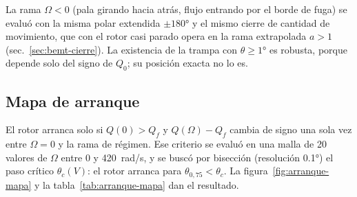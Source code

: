 \begin{nota}
La rama $\Omega<0$ (pala girando hacia atrás, flujo entrando por el borde de fuga) se evaluó
con la misma polar extendida $\pm\ang{180}$ y el mismo cierre de cantidad de movimiento,
que con el rotor casi parado opera en la rama extrapolada $a>1$
(sec.~\ref{sec:bemt-cierre}). La existencia de la trampa con $\theta\ge\ang{+1}$ es robusta,
porque depende solo del signo de $Q_0$; su posición exacta no lo es.
\end{nota}

\subsection{Mapa de arranque}

El rotor arranca solo si $Q(0)>Q_f$ y $Q(\Omega)-Q_f$ cambia de signo una sola vez entre
$\Omega=0$ y la rama de régimen. Ese criterio se evaluó en una malla de 20 valores de
$\Omega$ entre 0 y \SI{420}{rad/s}, y se buscó por bisección (resolución \ang{0.1}) el paso
crítico $\theta_c(V)$: el rotor arranca para $\theta_{0,75}<\theta_c$. La
figura~\ref{fig:arranque-mapa} y la tabla~\ref{tab:arranque-mapa} dan el resultado.

